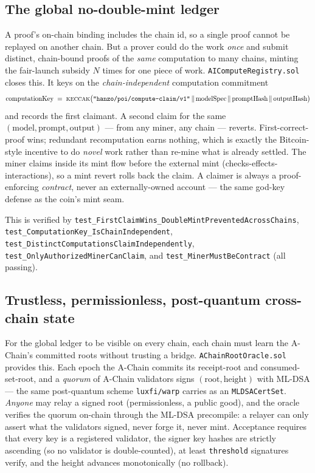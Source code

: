\documentclass[11pt,a4paper]{article}
\begin{document}
\subsection{The global no-double-mint ledger}\label{sec:registry}

A proof's on-chain binding includes the chain id, so a single proof cannot be replayed on another chain. But a prover could do the work \emph{once} and submit distinct, chain-bound proofs of the \emph{same} computation to many chains, minting the fair-launch subsidy $N$ times for one piece of work. \texttt{AIComputeRegistry.sol} closes this. It keys on the \emph{chain-independent} computation commitment
\[
  \text{computationKey} \;=\; \textsc{keccak}\big(\texttt{"hanzo/poi/compute-claim/v1"} \,\|\, \text{modelSpec} \,\|\, \text{promptHash} \,\|\, \text{outputHash}\big)
\]
and records the first claimant. A second claim for the same $(\text{model},\text{prompt},\text{output})$ --- from any miner, any chain --- reverts. First-correct-proof wins; redundant recomputation earns nothing, which is exactly the Bitcoin-style incentive to do \emph{novel} work rather than re-mine what is already settled. The miner claims inside its mint flow before the external mint (checks-effects-interactions), so a mint revert rolls back the claim. A claimer is always a proof-enforcing \emph{contract}, never an externally-owned account --- the same god-key defense as the coin's mint seam.

This is verified by \texttt{test\_FirstClaimWins\_DoubleMintPreventedAcrossChains}, \texttt{test\_ComputationKey\_IsChainIndependent}, \texttt{test\_DistinctComputationsClaimIndependently}, \texttt{test\_OnlyAuthorizedMinerCanClaim}, and \texttt{test\_MinerMustBeContract} (all passing).

\subsection{Trustless, permissionless, post-quantum cross-chain state}\label{sec:oracle}

For the global ledger to be visible on every chain, each chain must learn the A-Chain's committed roots without trusting a bridge. \texttt{AChainRootOracle.sol} provides this. Each epoch the A-Chain commits its receipt-root and consumed-set-root, and a \emph{quorum} of A-Chain validators signs $(\text{root},\text{height})$ with ML-DSA --- the same post-quantum scheme \texttt{luxfi/warp} carries as an \texttt{MLDSACertSet}. \emph{Anyone} may relay a signed root (permissionless, a public good), and the oracle verifies the quorum on-chain through the ML-DSA precompile: a relayer can only assert what the validators signed, never forge it, never mint. Acceptance requires that every key is a registered validator, the signer key hashes are strictly ascending (so no validator is double-counted), at least \texttt{threshold} signatures verify, and the height advances monotonically (no rollback).
\end{document}
